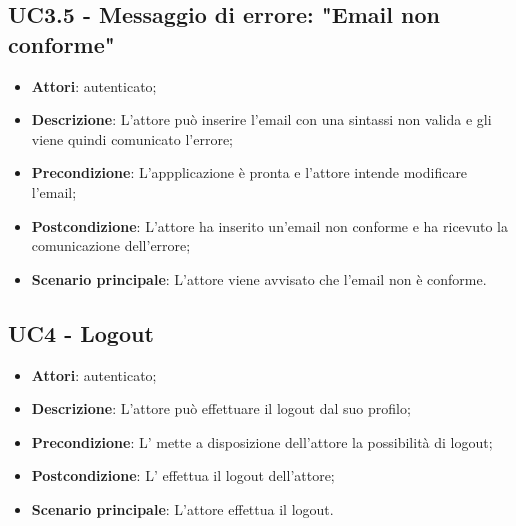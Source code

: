 \subsection{UC3.5 - Messaggio di errore: "Email non conforme"}
\label{ssec:UC3.5}
\begin{itemize}
\item \textbf{Attori}:  autenticato;
\item \textbf{Descrizione}: L'attore può inserire l'email con una sintassi non valida e gli viene quindi comunicato l'errore;
\item \textbf{Precondizione}: L'appplicazione è pronta e l'attore intende modificare l'email;
\item \textbf{Postcondizione}: L'attore ha inserito un'email non conforme e ha ricevuto la comunicazione dell'errore;
\item \textbf{Scenario principale}: L'attore viene avvisato che l'email non è conforme.
\end{itemize}
\newpage
\subsection{UC4 - Logout}
\label{ssec:UC4}
\begin{itemize}
\item \textbf{Attori}:  autenticato;
\item \textbf{Descrizione}: L'attore può effettuare il logout dal suo profilo;
\item \textbf{Precondizione}: L’ mette a disposizione dell’attore la possibilità di logout;
\item \textbf{Postcondizione}: L' effettua il logout dell'attore;
\item \textbf{Scenario principale}: L'attore effettua il logout.
\end{itemize}
\newpage
